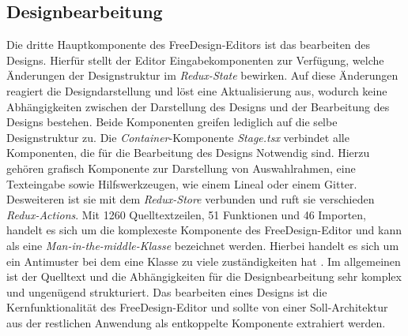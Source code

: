 \subsection{Designbearbeitung}
Die dritte Hauptkomponente des FreeDesign-Editors ist das bearbeiten des Designs. Hierfür stellt der Editor Eingabekomponenten zur Verfügung, welche Änderungen der Designstruktur im \textit{Redux-State} bewirken. Auf diese Änderungen reagiert die Designdarstellung und löst eine Aktualisierung aus, wodurch keine Abhängigkeiten zwischen der Darstellung des Designs und der Bearbeitung des Designs bestehen. Beide Komponenten greifen lediglich auf die selbe Designstruktur zu.  
Die \textit{Container}-Komponente \textit{Stage.tsx} verbindet alle Komponenten, die für die Bearbeitung des Designs Notwendig sind. Hierzu gehören grafisch Komponente zur Darstellung von Auswahlrahmen, eine Texteingabe sowie Hilfswerkzeugen, wie einem Lineal oder einem Gitter. 
Desweiteren ist sie mit dem \textit{Redux-Store} verbunden und ruft sie verschieden \textit{Redux-Actions}. 
Mit  1260 Quelltextzeilen, 51 Funktionen und 46 Importen, handelt es sich um die komplexeste Komponente des FreeDesign-Editor und kann als eine \textit{Man-in-the-middle-Klasse} bezeichnet werden. Hierbei handelt es sich um ein Antimuster bei dem eine Klasse zu viele zuständigkeiten hat \autocite[vgl.][619]{Geirhos2015}.
Im allgemeinen ist der Quelltext und die Abhängigkeiten für die Designbearbeitung sehr komplex und ungenügend strukturiert. Das bearbeiten eines Designs ist die Kernfunktionalität des FreeDesign-Editor und sollte von einer Soll-Architektur aus der restlichen Anwendung als entkoppelte Komponente extrahiert werden. 